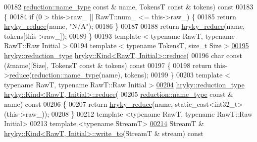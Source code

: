 \begin{DoxyCode}
00182     \hyperlink{classhryky_1_1reduction_1_1_string}{reduction::name_type} \textcolor{keyword}{const} & name, TokensT \textcolor{keyword}{const} & tokens)\textcolor{keyword}{ const}
00183 \textcolor{keyword}{}\{
00184     \textcolor{keywordflow}{if} (0 > this->raw\_ || RawT::num\_ <= this->raw\_) \{
00185         \textcolor{keywordflow}{return} \hyperlink{reduction__common_8h_afc72326c9900838c5db40438318794dd}{hryky_reduce}(name, \textcolor{stringliteral}{"N/A"});
00186     \}
00187 
00188     \textcolor{keywordflow}{return} \hyperlink{reduction__common_8h_afc72326c9900838c5db40438318794dd}{hryky_reduce}(name, tokens[this->raw\_]);
00189 \}
00193 \textcolor{keyword}{template} < \textcolor{keyword}{typename} RawT, \textcolor{keyword}{typename} RawT::Raw Initial >
00194 \textcolor{keyword}{template} < \textcolor{keyword}{typename} TokensT, \textcolor{keywordtype}{size\_t} Size >
\hypertarget{kind_8h_source_l00195}{}\hyperlink{classhryky_1_1_kind_a0a5d6d29bae3ac1b1bdd01fd90763b66}{00195} \hyperlink{classhryky_1_1_intrusive_ptr}{hryky::reduction_type} \hyperlink{namespacehryky_af41cb3af6766761da0ff21b84527a52c}{hryky::Kind<RawT, Initial>::reduce}(
00196     \textcolor{keywordtype}{char} \textcolor{keyword}{const} (&name)[Size], TokensT \textcolor{keyword}{const} & tokens)\textcolor{keyword}{ const}
00197 \textcolor{keyword}{}\{
00198     \textcolor{keywordflow}{return} this->\hyperlink{namespacehryky_af41cb3af6766761da0ff21b84527a52c}{reduce}(\hyperlink{classhryky_1_1reduction_1_1_string}{reduction::name_type}(name), tokens);
00199 \}
00203 \textcolor{keyword}{template} < \textcolor{keyword}{typename} RawT, \textcolor{keyword}{typename} RawT::Raw Initial >
\hypertarget{kind_8h_source_l00204}{}\hyperlink{classhryky_1_1_kind_ab11ab99ebf2c6d081648de78e8d7241f}{00204} \hyperlink{classhryky_1_1_intrusive_ptr}{hryky::reduction_type} \hyperlink{namespacehryky_af41cb3af6766761da0ff21b84527a52c}{hryky::Kind<RawT, Initial>::reduce}(
00205     \hyperlink{classhryky_1_1reduction_1_1_string}{reduction::name_type} \textcolor{keyword}{const} & name)\textcolor{keyword}{ const}
00206 \textcolor{keyword}{}\{
00207     \textcolor{keywordflow}{return} \hyperlink{reduction__common_8h_afc72326c9900838c5db40438318794dd}{hryky_reduce}(name, static\_cast<int32\_t>(this->raw\_));
00208 \}
00212 \textcolor{keyword}{template} <\textcolor{keyword}{typename} RawT, \textcolor{keyword}{typename} RawT::Raw Initial>
00213 \textcolor{keyword}{template} <\textcolor{keyword}{typename} StreamT>
\hypertarget{kind_8h_source_l00214}{}\hyperlink{classhryky_1_1_kind_a1c070e6cf60cc110690142667089c3ff}{00214} StreamT & \hyperlink{classhryky_1_1_kind}{hryky::Kind<RawT, Initial>::write_to}(StreamT & stream)\textcolor{keyword}{ const}

\end{DoxyCode}
